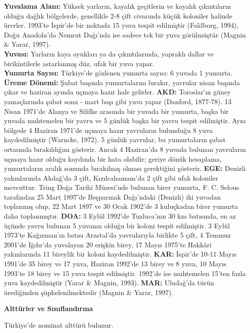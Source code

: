\documentclass[
  a4paper,
  DIV=11,
  numbers=noendperiod]{scrreprt}
\begin{document}
\textbf{Yuvalama Alanı:} Yüksek yarların, kayalık geçitlerin ve kayalık
çıkıntıların olduğu dağlık bölgelerde, genellikle 2-8 çift civarında
küçük koloniler halinde ürerler. 1993'te İspir'de bir noktada 15 yuva
tespit edilmiştir (Faldborg, 1994), Doğu Anadolu'da Nemrut Dağı'nda ise
sadece tek bir yuva görülmüştür (Magnin \& Yarar, 1997).\\
\textbf{Yuvası:} Yarların kaya oyukları ya da çıkıntılarında, yapraklı
dallar ve birikintilerle astarlanmış düz, ufak bir yuva yapar.\\
\textbf{Yumurta Sayısı:} Türkiye'de gözlenen yumurta sayısı: 6 yuvada 1
yumurta.\\
\textbf{Üreme Dönemi:} Şubat başında yumurtalarını bırakır, yavrular
nisan başında çıkar ve haziran ayında uçmaya hazır hale gelirler.
\textbf{AKD:} Toroslar'ın güney yamaçlarında şubat sonu - mart başı gibi
yuva yapar (Danford, 1877-78). 13 Nisan 1971'de Alanya ve Silifke
arasında bir yuvada bir yumurta, başka bir yuvada muhtemelen bir yavru
ve 5 günlük başka bir yavru tespit edilmiştir. Aynı bölgede 4 Haziran
1971'de uçmaya hazır yavruların bulunduğu 8 yuva kaydedilmiştir
(Warncke, 1972). 5 günlük yavrular, bu yumurtaların şubat ortasında
bırakıldığını gösterir. Ancak 4 Haziran'da 8 yuvada bulunan yavruların
uçmaya hazır olduğu kaydında bir hata olabilir; geriye dönük hesaplama,
yumurtaların aralık sonunda bırakılmış olması gerektiğini gösterir.
\textbf{EGE:} Denizli yakınlarında Akdağ'da 3 çift, Kızılcahamam'da 2
çift gibi ufak koloniler mevcuttur. Tring Doğa Tarihi Müzesi'nde bulunan
birer yumurta, F. C. Selous tarafından 25 Mart 1897'de Beşparmak
Dağı'ndaki (Denizli) iki yuvadan toplanmış olup, 22 Mart 1897 ve 30 Ocak
1902'de 3 kuluçkadan birer yumurta daha toplanmıştır. \textbf{DOA:} 3
Eylül 1992'de Tuzluca'nın 30 km batısında, en az üçünde yavru bulunan 5
yuvanın olduğu bir koloni tespit edilmiştir. 3 Eylül 1973'te Kağızman'ın
batısı Arastal'da yavrularıyla birlikte 5 çift, 4 Temmuz 2001'de
Iğdır'da yuvalayan 20 erişkin birey, 17 Mayıs 1975'te Hakkâri
yakınlarında 11 bireylik bir koloni kaydedilmiştir. \textbf{KAR:}
İspir'de 10-11 Mayıs 1991'de 35 birey ve 17 yuva, Haziran 1992'de 13
birey ve 8 yuva, 10 Mayıs 1993'te 18 birey ve 15 yuva tespit edilmiştir.
1992'de ise muhtemelen 15'ten fazla yuva kaydedilmiştir (Yarar \&
Magnin, 1993). \textbf{MAR:} Uludağ'da türün ürediğinden
şüphelenilmektedir (Magnin \& Yarar, 1997).

\textbf{Alttürler ve Sınıflandırma}

Türkiye'de nominat alttürü bulunur.
\end{document}
